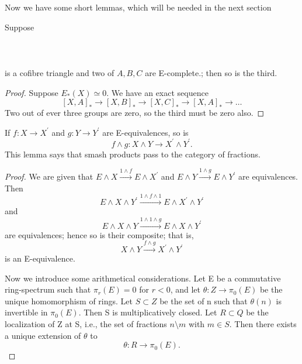 \documentclass[../main]{subfiles}
\begin{document}
Now we have some short lemmas, which will be needed in the next section
\begin{lemma} \label{lem:p3ch14.15}
Suppose
~\\~\\
~\\~\\
is a cofibre triangle and two of $A,B,C$ are E-complete.; then so is the third.

 \begin{proof} 
    Suppose $E_{\ast}(X)\simeq 0.$ We have an exact sequence
    $$
      \left[X,A\right]_{\ast} \to \left[X,B\right]_{\ast} \to \left[X,C\right]_{\ast} \to \left[X,A\right]_{\ast} \to \ldots
    $$ 
    Two out of ever three groups are zero, so the third must be zero also.
\end{proof}
\end{lemma}
\begin{lemma} \label{lem:p3ch14.16}
If $f\colon  X \to  X^{\prime} $ and $g\colon  Y \to  Y^{\prime} $ are E-equivalences, so is 
$$
  f \wedge g \colon X \wedge Y \to X^{\prime} \wedge Y^{\prime} .
$$ 
This lemma says that smash products pass to the category of fractions.
\begin{proof} 
    We are given that $E \wedge X \xrightarrow{1 \wedge f} E \wedge X^{\prime} $ and $E \wedge Y \xrightarrow{1 \wedge g} E \wedge Y^{\prime}$ are equivalences. Then
    $$
      E \wedge X \wedge Y^{\prime} \xrightarrow{1\wedge f \wedge 1} E \wedge X^{\prime} \wedge Y^{\prime} 
    $$ 
    and 
    $$
      E \wedge X \wedge Y \xrightarrow{1\wedge 1 \wedge g} E \wedge X \wedge Y^{\prime} 
    $$ 
    are equivalences; hence so is their composite; that is,
    $$
    X \wedge Y \xrightarrow{f \wedge g} X^{\prime} \wedge Y^{\prime}
    $$ 
    is an E-equivalence.

    Now we introduce some arithmetical considerations. Let E be a commutative ring-spectrum such that $\pi_{r}(E)=0$ for $r < 0$, and let  $\theta\colon  Z \to  \pi_{0}(E) $ be the unique homomorphism of rings. Let $S \subset Z$ be the set of n such that $\theta(n)$ is invertible in $\pi_{0}(E)$. Then S is multiplicatively closed. Let $R \subset Q$ be the localization of Z at S, i.e., the set of fractions $n\setminus m$ with $m \in  S$. Then there exists a unique extension of $\theta$ to
    $$
      \theta\colon  R \to  \pi_{0}(E) .
    $$ 
\end{proof}
\end{lemma}
\end{document}

